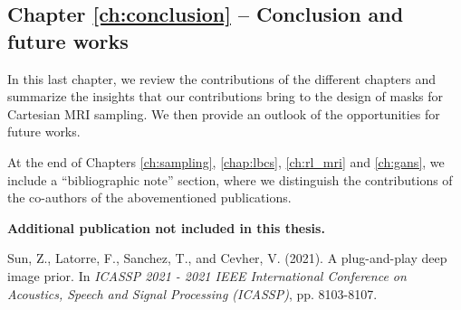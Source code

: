 \subsection*{Chapter \ref{ch:conclusion} -- Conclusion and future works}
In this last chapter, we review the contributions of the different chapters and summarize the insights that our contributions bring to the design of masks for Cartesian MRI sampling. We then provide an outlook of the opportunities for future works. 

\begin{remark}
    At the end of Chapters \ref{ch:sampling}, \ref{chap:lbcs}, \ref{ch:rl_mri} and \ref{ch:gans}, we include a ``bibliographic note'' section, where we distinguish the contributions of the co-authors of the abovementioned publications. 
\end{remark}


\textbf{Additional publication not included in this thesis.} 
\begin{adjustwidth}{.5cm}{}
Sun, Z., Latorre, F., Sanchez, T., and Cevher, V. (2021). A plug-and-play deep image prior. In \textit{ICASSP 2021 - 2021 IEEE International Conference on Acoustics, Speech and Signal Processing (ICASSP)}, pp. 8103-8107.
\end{adjustwidth}
